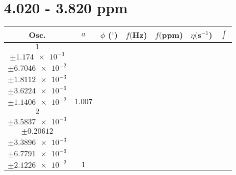 \documentclass[8pt]{article}
\begin{document}
\section*{4.020 - 3.820 ppm}
\begin{longtable}[l]{c c c c c c c}
\toprule
Osc. & $a$ & $\phi$ ($^{\circ}$) & $f ($Hz) & $f ($ppm) & $\eta ($s$^{-1}$) & $\int$\\
\midrule
$\num{1}$ & \begin{tabular}[c]{@{}c@{}}$\num{1.0022}$ \\ $\pm\num{1.174e-3}$\end{tabular} & \begin{tabular}[c]{@{}c@{}}$\num{4.1216e-2}$ \\ $\pm\num{6.7046e-2}$\end{tabular} & \begin{tabular}[c]{@{}c@{}}$\num{1.9386e+3}$ \\ $\pm\num{1.8112e-3}$\end{tabular} & \begin{tabular}[c]{@{}c@{}}$\num{3.8772}$ \\ $\pm\num{3.6224e-6}$\end{tabular} & \begin{tabular}[c]{@{}c@{}}$\num{7.0109}$ \\ $\pm\num{1.1406e-2}$\end{tabular} & $\num{1.007}$\\
$\num{2}$ & \begin{tabular}[c]{@{}c@{}}$\num{0.9947}$ \\ $\pm\num{3.5837e-3}$\end{tabular} & \begin{tabular}[c]{@{}c@{}}$\num{-4.2748e-2}$ \\ $\pm\num{0.20612}$\end{tabular} & \begin{tabular}[c]{@{}c@{}}$\num{1.9588e+3}$ \\ $\pm\num{3.3896e-3}$\end{tabular} & \begin{tabular}[c]{@{}c@{}}$\num{3.9176}$ \\ $\pm\num{6.7791e-6}$\end{tabular} & \begin{tabular}[c]{@{}c@{}}$\num{6.9866}$ \\ $\pm\num{2.1226e-2}$\end{tabular} & $\num{1}$\\

\end{longtable}
\end{document}
